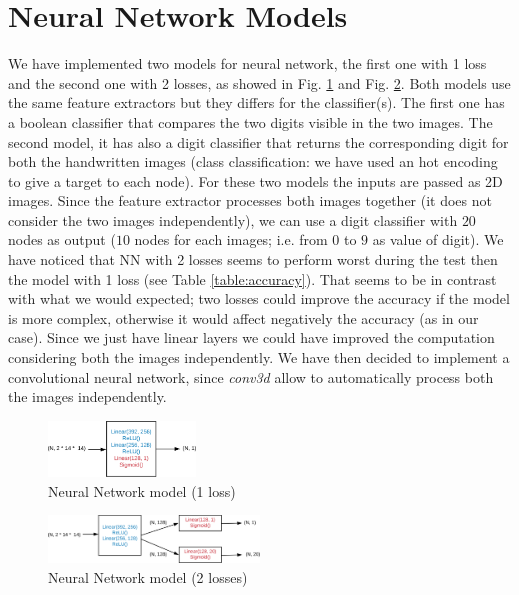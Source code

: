 \documentclass[journal, a4paper]{IEEEtran}
\begin{document}
\section{Neural Network Models}
\label{sec:nnmodel}
We have implemented two models for neural network, the first one with 1 loss and the second one with 2 losses, as showed in Fig. \ref{fig:nn1} and Fig. \ref{fig:nn2}. Both models use the same feature extractors but they differs for the classifier(s). The first one has a boolean classifier that compares the two digits visible in the two images. The second model, it has also a digit classifier that returns the corresponding digit for both the handwritten images (class classification: we have used an hot encoding to give a target to each node).
For these two models the inputs are passed as 2D images. %
Since the feature extractor processes both images together (it does not consider the two images independently), we can use a digit classifier with $20$ nodes as output ($10$ nodes for each images; i.e. from $0$ to $9$ as value of digit). We have noticed that NN with 2 losses seems to perform worst during the test then the model with 1 loss (see Table \ref{table:accuracy}). That seems to be in contrast with what we would expected; two losses could improve the accuracy if the model is more complex, otherwise it would affect negatively the accuracy (as in our case). Since we just have linear layers we could have improved the computation considering both the images independently. We have then decided to implement a convolutional neural network, since \textit{conv3d} allow to automatically process both the images independently.
\begin{figure}[!h]
    \centering
    \includegraphics[width=0.35\textwidth]{nn1.png}
    \caption{Neural Network model (1 loss)}
    \label{fig:nn1}
\end{figure}

\begin{figure}[!h]
    \centering
    \includegraphics[width=0.5\textwidth]{nn2.png}
    \caption{Neural Network model (2 losses)}
    \label{fig:nn2}
\end{figure}
\end{document}
